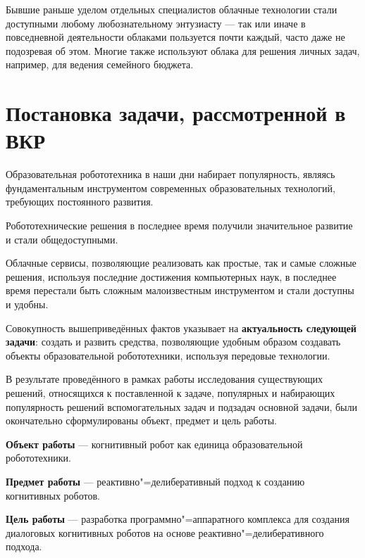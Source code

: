 Бывшие раньше уделом отдельных специалистов облачные технологии стали доступными любому любознательному энтузиасту --- так или иначе в повседневной деятельности облаками пользуется почти каждый, часто даже не подозревая об этом. Многие также используют облака для решения личных задач, например, для ведения семейного бюджета.

\chapter*{Постановка задачи, рассмотренной в ВКР}
Образовательная робототехника в наши дни набирает популярность, являясь фундаментальным инструментом современных образовательных технологий, требующих постоянного развития.

Робототехнические решения в последнее время получили значительное развитие и стали общедоступными.

Облачные сервисы, позволяющие реализовать как простые, так и самые сложные решения, используя последние достижения компьютерных наук, в последнее время перестали быть сложным малоизвестным инструментом и стали доступны и удобны.

Совокупность вышеприведённых фактов указывает на \textbf{актуальность следующей задачи}: создать и развить средства, позволяющие удобным образом создавать объекты образовательной робототехники, используя передовые технологии.


В результате проведённого в рамках работы исследования существующих решений, относящихся к поставленной к задаче, популярных и набирающих популярность решений вспомогательных задач и подзадач основной задачи, были окончательно сформулированы объект, предмет и цель работы.

\textbf{Объект работы} --- когнитивный робот как единица образовательной робототехники.

\textbf{Предмет работы} --- реактивно"=делиберативный подход к созданию когнитивных роботов.

\textbf{Цель работы} --- разработка программно"=аппаратного комплекса для создания диалоговых когнитивных роботов на основе реактивно"=делиберативного подхода.